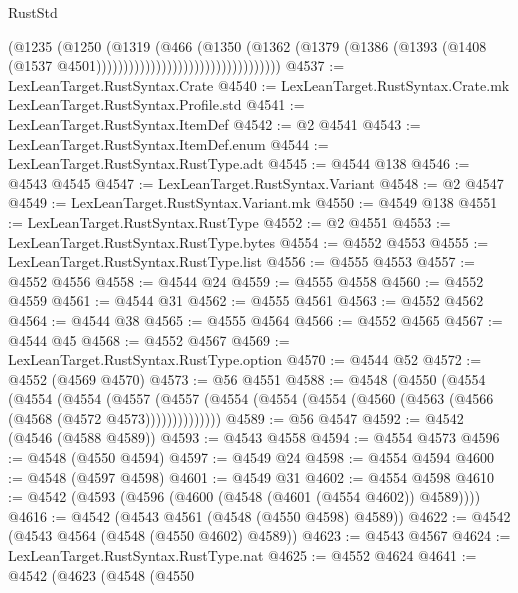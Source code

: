 \begin{lexlean}{RustStd}
\begin{coremodule}
                                                  (@1235
                                                    (@1250
                                                      (@1319
                                                        (@466
                                                          (@1350
                                                            (@1362
                                                              (@1379
                                                                (@1386
                                                                  (@1393
                                                                    (@1408
                                                                      (@1537
                                                                        @4501))))))))))))))))))))))))))))))))))
@4537 := LexLeanTarget.RustSyntax.Crate
@4540 := LexLeanTarget.RustSyntax.Crate.mk LexLeanTarget.RustSyntax.Profile.std
@4541 := LexLeanTarget.RustSyntax.ItemDef
@4542 := @2 @4541
@4543 := LexLeanTarget.RustSyntax.ItemDef.enum
@4544 := LexLeanTarget.RustSyntax.RustType.adt
@4545 := @4544 @138
@4546 := @4543 @4545
@4547 := LexLeanTarget.RustSyntax.Variant
@4548 := @2 @4547
@4549 := LexLeanTarget.RustSyntax.Variant.mk
@4550 := @4549 @138
@4551 := LexLeanTarget.RustSyntax.RustType
@4552 := @2 @4551
@4553 := LexLeanTarget.RustSyntax.RustType.bytes
@4554 := @4552 @4553
@4555 := LexLeanTarget.RustSyntax.RustType.list
@4556 := @4555 @4553
@4557 := @4552 @4556
@4558 := @4544 @24
@4559 := @4555 @4558
@4560 := @4552 @4559
@4561 := @4544 @31
@4562 := @4555 @4561
@4563 := @4552 @4562
@4564 := @4544 @38
@4565 := @4555 @4564
@4566 := @4552 @4565
@4567 := @4544 @45
@4568 := @4552 @4567
@4569 := LexLeanTarget.RustSyntax.RustType.option
@4570 := @4544 @52
@4572 := @4552 (@4569 @4570)
@4573 := @56 @4551
@4588 := @4548
    (@4550
      (@4554
        (@4554
          (@4554
            (@4557
              (@4557 (@4554 (@4554 (@4554 (@4560 (@4563 (@4566 (@4568 (@4572 @4573))))))))))))))
@4589 := @56 @4547
@4592 := @4542 (@4546 (@4588 @4589))
@4593 := @4543 @4558
@4594 := @4554 @4573
@4596 := @4548 (@4550 @4594)
@4597 := @4549 @24
@4598 := @4554 @4594
@4600 := @4548 (@4597 @4598)
@4601 := @4549 @31
@4602 := @4554 @4598
@4610 := @4542 (@4593 (@4596 (@4600 (@4548 (@4601 (@4554 @4602)) @4589))))
@4616 := @4542 (@4543 @4561 (@4548 (@4550 @4598) @4589))
@4622 := @4542 (@4543 @4564 (@4548 (@4550 @4602) @4589))
@4623 := @4543 @4567
@4624 := LexLeanTarget.RustSyntax.RustType.nat
@4625 := @4552 @4624
@4641 := @4542
    (@4623
      (@4548
        (@4550

\end{coremodule}
\end{lexlean}
